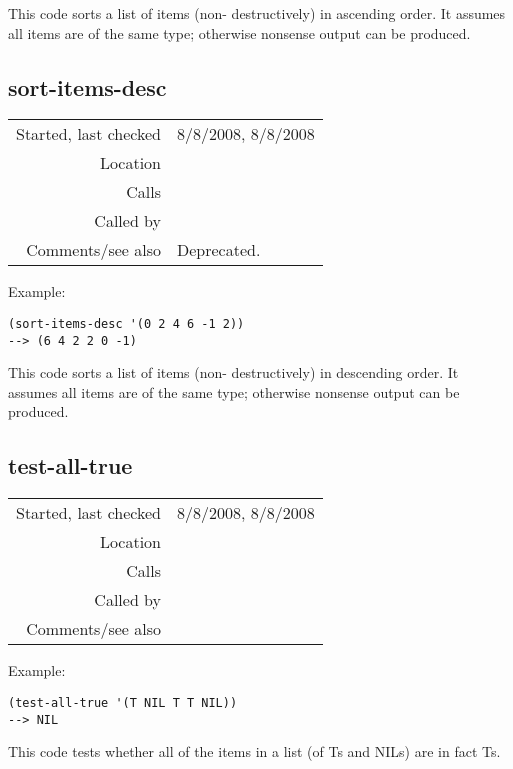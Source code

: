 \noindent This code sorts a list of items (non-
destructively) in ascending order. It assumes all
items are of the same type; otherwise nonsense output
can be produced.


\subsection*{sort-items-desc}\label{fun:sort-items-desc}

\vspace{0.3cm}
\begin{tabular}{r|p{8cm}}
Started, last checked & 8/8/2008, 8/8/2008 \\
Location & \nameref{sec:sort-by} \\
Calls & \\
Called by & \\
Comments/see also & Deprecated.
\end{tabular}

\vspace{0.5cm}
\noindent Example:
\begin{verbatim}
(sort-items-desc '(0 2 4 6 -1 2))
--> (6 4 2 2 0 -1)
\end{verbatim}

\noindent This code sorts a list of items (non-
destructively) in descending order. It assumes all
items are of the same type; otherwise nonsense output
can be produced.


\subsection*{test-all-true}\label{fun:test-all-true}

\vspace{0.3cm}
\begin{tabular}{r|p{8cm}}
Started, last checked & 8/8/2008, 8/8/2008 \\
Location & \nameref{sec:sort-by} \\
Calls & \\
Called by & \nameref{fun:nos-consecutives-with-nonempty-fixed} \\
Comments/see also &
\end{tabular}

\noindent Example:
\begin{verbatim}
(test-all-true '(T NIL T T NIL))
--> NIL
\end{verbatim}

\noindent This code tests whether all of the items in
a list (of Ts and NILs) are in fact Ts.







